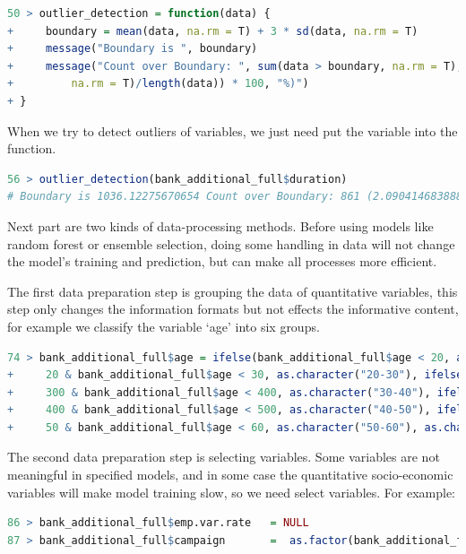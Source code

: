 \documentclass[12pt, a4paper, bibliography=totoc, english]{scrartcl}
\begin{document}
\begin{lstlisting}[language = R]
50 > outlier_detection = function(data) {
+     boundary = mean(data, na.rm = T) + 3 * sd(data, na.rm = T)
+     message("Boundary is ", boundary)
+     message("Count over Boundary: ", sum(data > boundary, na.rm = T), " (", (sum(data > boundary, 
+         na.rm = T)/length(data)) * 100, "%)")
+ }
\end{lstlisting}

When we try to detect outliers of variables, we just need put the variable into the function.

\begin{lstlisting}[language = R]
56 > outlier_detection(bank_additional_full$duration)
# Boundary is 1036.12275670654 Count over Boundary: 861 (2.09041468388851%)
\end{lstlisting}

Next part are two kinds of data-processing methods. Before using models like random forest or ensemble selection, doing some handling in data will not change the model's training and prediction, but can make all processes more efficient. 

The first data preparation step is grouping the data of quantitative variables, this step only changes the information formats but not effects the informative content, for example we classify the variable `age' into six groups.

\begin{lstlisting}[language = R]
74 > bank_additional_full$age = ifelse(bank_additional_full$age < 20, as.character("20-"), ifelse(bank_additional_full$age >= 
+     20 & bank_additional_full$age < 30, as.character("20-30"), ifelse(bank_additional_full$age >= 
+     300 & bank_additional_full$age < 400, as.character("30-40"), ifelse(bank_additional_full$age >= 
+     400 & bank_additional_full$age < 500, as.character("40-50"), ifelse(bank_additional_full$age >= 
+     50 & bank_additional_full$age < 60, as.character("50-60"), as.character("60+"))))))
\end{lstlisting}

The second data preparation step is selecting variables. Some variables are not meaningful in specified models, and in some case the quantitative socio-economic variables will make model training slow, so we need select variables. For example:

\begin{lstlisting}[language = R]
86 > bank_additional_full$emp.var.rate   = NULL  
87 > bank_additional_full$campaign       =  as.factor(bank_additional_full$campaign)
\end{lstlisting}
\end{document}
